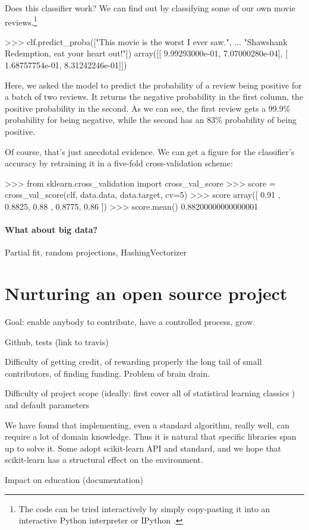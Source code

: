 \documentclass[a4paper]{article}
\begin{document}
Does this classifier work?
We can find out by classifying some of our own movie reviews.\footnote{
  The code can be tried interactively by simply copy-pasting it
  into an interactive Python interpreter or IPython \cite{perez2007ipython}.
}

\begin{pythoncode}
>>> clf.predict\_proba(["This movie is the worst I ever saw.",
...                    "Shawshank Redemption, eat your heart out!"])
array([[  9.99293000e-01,   7.07000280e-04],
       [  1.68757754e-01,   8.31242246e-01]])
\end{pythoncode}

Here, we asked the model to predict the probability of a review being positive
for a batch of two reviews. It returns the negative probability in the first
column, the positive probability in the second.
As we can see, the first review gets a 99.9\% probability for being negative,
while the second has an 83\% probability of being positive.

Of course, that's just anecdotal evidence. We can get a figure for the
classifier's accuracy by retraining it in a five-fold cross-validation scheme:

\begin{pythoncode}
>>> from sklearn.cross\_validation import cross\_val\_score
>>> score = cross\_val\_score(clf, data.data, data.target, cv=5)
>>> score
array([ 0.91  ,  0.8825,  0.88  ,  0.8775,  0.86  ])
>>> score.mean()
0.88200000000000001
\end{pythoncode}

\paragraph{What about big data?}
%
Partial fit, random projections, HashingVectorizer

\section{Nurturing an open source project}

Goal: enable anybody to contribute, have a controlled process, grow.

Github, tests (link to travis)

Difficulty of getting credit, of rewarding properly the long tail of small
contributors, of finding funding. Problem of brain drain.

Difficulty of project scope (ideally: first cover all of statistical
learning classics \cite{elemstatlearn}) and default parameters

We have found that implementing, even a standard algorithm, really well,
can require a lot of domain knowledge. Thus it is natural that specific
libraries span up to solve it. Some adopt scikit-learn API and standard,
and we hope that scikit-learn has a structural effect on the environment.

Impact on education (documentation)

\small


\end{document}
